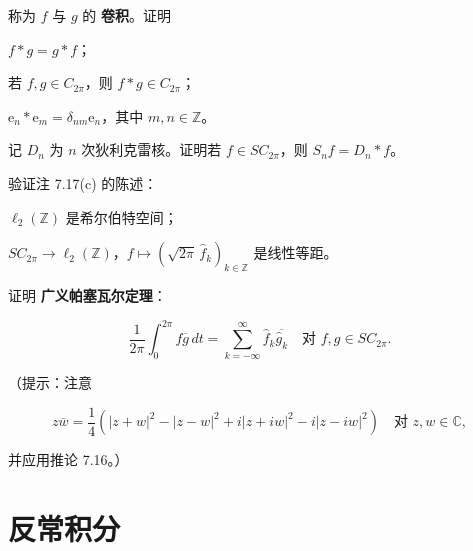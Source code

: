 \begin{exercises}
称为 $ f $ 与 $ g $ 的 \textbf{卷积}。证明

\begin{subitems}
\item

$ f * g = g * f $；

\item

若 $ f, g \in C_{2\pi} $，则 $ f * g \in C_{2\pi} $；

\item

$ \mathrm{e}_{n} * \mathrm{e}_{m} = \delta_{nm}\mathrm{e}_{n} $，其中 $ m, n \in \mathbb{Z} $。

\end{subitems}

\item

记 $ D_{n} $ 为 $ n $ 次狄利克雷核。证明若 $ f \in SC_{2\pi} $，则 $ S_{n}f = D_{n} * f $。

\item

验证注 7.17(c) 的陈述：

\begin{subitems}
\item

$ \ell_{2}(\mathbb{Z}) $ 是希尔伯特空间；

\item

$ SC_{2\pi} \to \ell_{2}(\mathbb{Z}) $，$ f \mapsto (\sqrt{2\pi}\,\widehat{f}_{k})_{k \in \mathbb{Z}} $ 是线性等距。

\end{subitems}

\item

证明 \textbf{广义帕塞瓦尔定理}：

\[
\frac{1}{2\pi}\int_{0}^{2\pi} f\overline{g}\, dt = \sum_{k=-\infty}^{\infty}\widehat{f}_{k}\overline{\widehat{g}_{k}} \quad \text{对 } f, g \in SC_{2\pi} .
\]

（提示：注意

\[
z\overline{w} = \frac{1}{4}(|z + w|^{2} - |z - w|^{2} + i|z + iw|^{2} - i|z - iw|^{2}) \quad \text{对 } z, w \in \mathbb{C} ,
\]

并应用推论 7.16。）

\end{exercises}

\section{反常积分}

